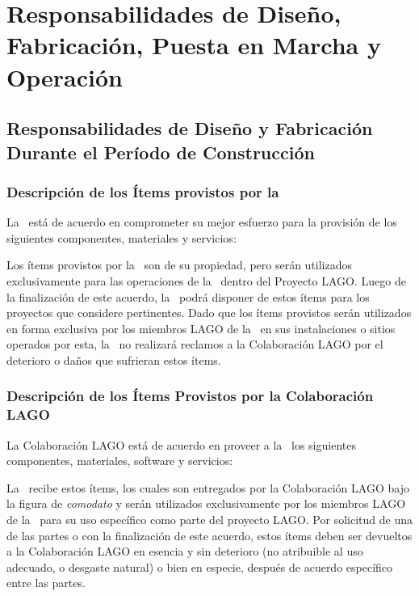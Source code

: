 \section{Responsabilidades de Diseño, Fabricación, Puesta en Marcha y
Operación}

\subsection{Responsabilidades de Diseño y Fabricación Durante el Período de
Construcción}

\subsubsection{Descripción de los Ítems provistos por la \institution}

La \institution~está de acuerdo en comprometer su mejor esfuerzo para la
provisión de los siguientes componentes, materiales y servicios: 



Los ítems provistos por la \institution~son de su propiedad, pero serán
utilizados exclusivamente para las operaciones de la \institution~dentro del
Proyecto LAGO. Luego de la finalización de este acuerdo, la \institution~podrá
disponer de estos ítems para los proyectos que considere pertinentes. Dado que
los ítems provistos serán utilizados en forma exclusiva por los miembros LAGO
de la \institution~en sus instalaciones o sitios operados por esta, la
\institution~no realizará reclamos a la Colaboración LAGO por el deterioro o
daños que sufrieran estos ítems.

\subsubsection{Descripción de los Ítems Provistos por la Colaboración LAGO}

La Colaboración LAGO está de acuerdo en proveer a la \institution~los
siguientes componentes, materiales, software y servicios: 

 

La \institution~recibe estos ítems, los cuales son entregados por la
Colaboración LAGO bajo la figura de  {\it{comodato}} y serán utilizados
exclusivamente por los miembros LAGO de la \institution~para su uso específico
como parte del proyecto LAGO. Por solicitud de una de las partes o con la
finalización de  este acuerdo, estos ítems deben ser devueltos a la
Colaboración LAGO en esencia y sin deterioro (no atribuible al uso adecuado, o desgaste natural) o bien en especie, después de
acuerdo específico entre las partes.

